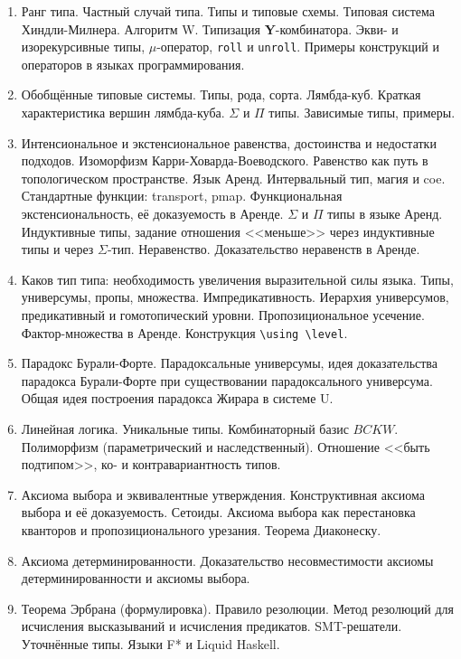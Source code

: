 \documentclass[11pt,a4paper,oneside]{article}
\begin{document}
\begin{enumerate}
\item Ранг типа. Частный случай типа. Типы и типовые схемы. Типовая система Хиндли-Милнера. Алгоритм W.
Типизация \textbf{Y}-комбинатора. Экви- и изорекурсивные типы, $\mu$-оператор, \texttt{roll} и \texttt{unroll}.
Примеры конструкций и операторов в языках программирования.
\item Обобщённые типовые системы. Типы, рода, сорта. Лямбда-куб. Краткая характеристика вершин лямбда-куба. 
$\Sigma$ и $\Pi$ типы. Зависимые типы, примеры.
\item Интенсиональное и экстенсиональное равенства, достоинства и недостатки подходов.
Изоморфизм Карри-Ховарда-Воеводского.
Равенство как путь в топологическом пространстве. Язык Аренд. Интервальный тип, магия и coe. 
Стандартные функции: transport, pmap. 
Функциональная экстенсиональность, её доказуемость в Аренде. $\Sigma$ и $\Pi$ типы в языке Аренд. 
Индуктивные типы, задание отношения <<меньше>> через индуктивные типы и через $\Sigma$-тип. 
Неравенство. Доказательство неравенств в Аренде.
\item Каков тип типа: необходимость увеличения выразительной силы языка.
Типы, универсумы, пропы, множества. Импредикативность. Иерархия универсумов, предикативный и гомотопический 
уровни. Пропозициональное усечение. Фактор-множества в Аренде. Конструкция \verb!\using \level!. 
\item Парадокс Бурали-Форте. Парадоксальные универсумы, идея доказательства парадокса Бу\-ра\-ли-Форте при 
существовании парадоксального универсума. Общая идея построения парадокса Жирара в системе U.
\item Линейная логика. Уникальные типы. Комбинаторный базис $BCKW$. Полиморфизм (параметрический и наследственный).
Отношение <<быть подтипом>>, ко- и контравариантность типов.
\item Аксиома выбора и эквивалентные утверждения. 
Конструктивная аксиома выбора и её доказуемость. Сетоиды. Аксиома выбора как перестановка кванторов и пропозиционального
урезания. Теорема Диаконеску. 
\item Аксиома детерминированности. Доказательство несовместимости аксиомы детерминированности и аксиомы выбора.
\item Теорема Эрбрана (формулировка). Правило резолюции. Метод резолюций для исчисления высказываний и исчисления предикатов. 
SMT-решатели. Уточнённые типы. Языки F* и Liquid Haskell.
\end{enumerate}
\end{document}

